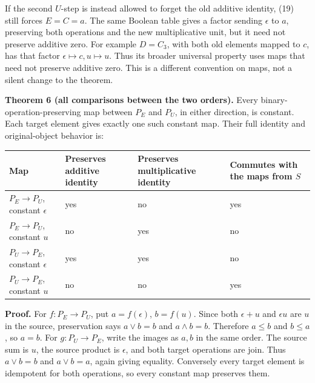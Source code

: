 \documentclass[
]{article}
\newcounter{none} %
\begin{document}
If the second \(U\)-step is instead allowed to forget the old additive
identity, (19) still forces \(E=C=a\). The same Boolean table gives a
factor sending \(\epsilon\) to \(a\), preserving both operations and the
new multiplicative unit, but it need not preserve additive zero. For
example \(D=C_3\), with both old elements mapped to \(c\), has that
factor \(\epsilon\mapsto c,u\mapsto u\). Thus its broader universal
property uses maps that need not preserve additive zero. This is a
different convention on maps, not a silent change to the theorem.

\textbf{Theorem 6 (all comparisons between the two orders).} Every
binary-operation-preserving map between \(P_E\) and \(P_U\), in either
direction, is constant. Each target element gives exactly one such
constant map. Their full identity and original-object behavior is:

{\def\LTcaptype{none} %
\begin{longtable}[]{@{}
  >{\raggedright\arraybackslash}p{}
  >{\raggedright\arraybackslash}p{}
  >{\raggedright\arraybackslash}p{}
  >{\raggedright\arraybackslash}p{}@{}}
\toprule\noalign{}
\begin{minipage}[b]{\linewidth}\raggedright
Map
\end{minipage} & \begin{minipage}[b]{\linewidth}\raggedright
Preserves additive identity
\end{minipage} & \begin{minipage}[b]{\linewidth}\raggedright
Preserves multiplicative identity
\end{minipage} & \begin{minipage}[b]{\linewidth}\raggedright
Commutes with the maps from \(S\)
\end{minipage} \\
\midrule\noalign{}
\endhead
\bottomrule\noalign{}
\endlastfoot
\(P_E\to P_U\), constant \(\epsilon\) & yes & no & yes \\
\(P_E\to P_U\), constant \(u\) & no & yes & no \\
\(P_U\to P_E\), constant \(\epsilon\) & yes & yes & no \\
\(P_U\to P_E\), constant \(u\) & no & no & yes \\
\end{longtable}
}

\textbf{Proof.} For \(f:P_E\to P_U\), put \(a=f(\epsilon)\), \(b=f(u)\).
Since both \(\epsilon+u\) and \(\epsilon u\) are \(u\) in the source,
preservation says \(a\vee b=b\) and \(a\wedge b=b\). Therefore
\(a\le b\) and \(b\le a\), so \(a=b\). For \(g:P_U\to P_E\), write the
images as \(a,b\) in the same order. The source sum is \(u\), the source
product is \(\epsilon\), and both target operations are join. Thus
\(a\vee b=b\) and \(a\vee b=a\), again giving equality. Conversely every
target element is idempotent for both operations, so every constant map
preserves them.
\end{document}
